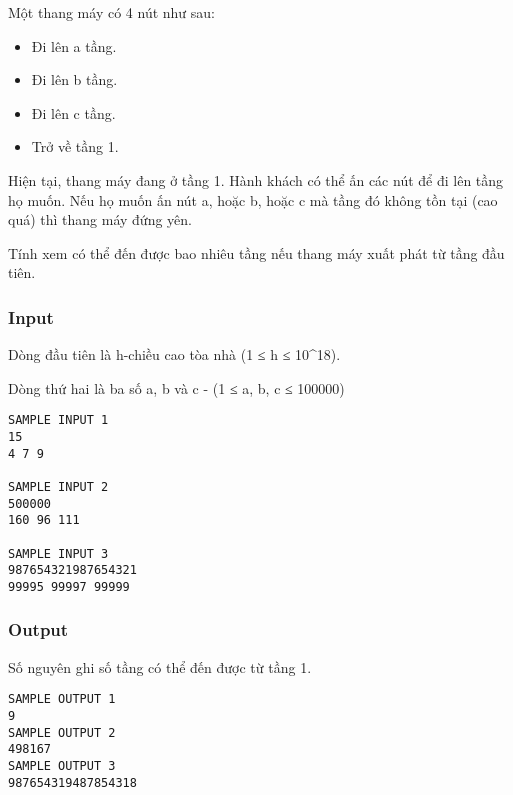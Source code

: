 

Một thang máy có 4 nút như sau:
\begin{itemize}
	\item Đi lên a tầng.
	\item Đi lên b tầng.
	\item Đi lên c tầng.
	\item Trở về tầng 1.
\end{itemize}

Hiện tại, thang máy đang ở tầng 1. Hành khách có thể ấn các nút để đi lên tầng họ muốn. Nếu họ muốn ấn nút a, hoặc b, hoặc c mà tầng đó không tồn tại (cao quá) thì thang máy đứng yên.

Tính xem có thể đến được bao nhiêu tầng nếu thang máy xuất phát từ tầng đầu tiên.

\subsubsection{Input}

Dòng đầu tiên là h-chiều cao tòa nhà (1 ≤ h ≤ 10^18).

Dòng thứ hai là ba số a, b và c - (1 ≤ a, b, c ≤ 100000)
\begin{verbatim}
SAMPLE INPUT 1
15
4 7 9

SAMPLE INPUT 2
500000
160 96 111

SAMPLE INPUT 3
987654321987654321
99995 99997 99999

\end{verbatim}

\subsubsection{Output}

Số nguyên ghi số tầng có thể đến được từ tầng 1.
\begin{verbatim}
SAMPLE OUTPUT 1
9
SAMPLE OUTPUT 2
498167
SAMPLE OUTPUT 3
987654319487854318
\end{verbatim}

 
